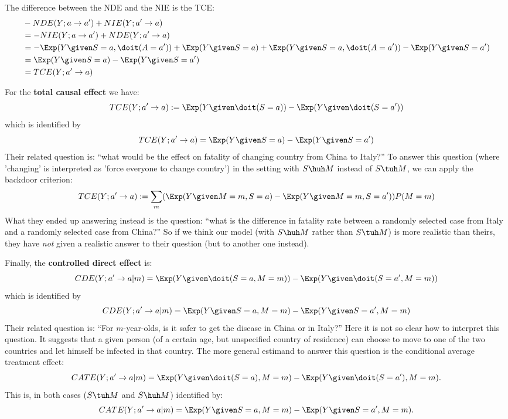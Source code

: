 \begin{Rem}
The difference between the NDE and the NIE is the TCE:
  \begin{equation}\label{eq:nie_interventional+nde_interventional}\begin{split}
    &-NDE(Y; a \to a') + NIE(Y; a' \to a) \\
    & = -NIE(Y; a \to a') + NDE(Y; a' \to a) \\
    & = -\Exp(Y \given S=a, \doit(A=a')) + \Exp(Y \given S=a) + \Exp(Y \given S=a, \doit(A=a')) - \Exp(Y \given S=a') \\
    & =  \Exp(Y \given S=a) - \Exp(Y \given S=a') \\
    & = TCE(Y; a' \to a)
  \end{split}\end{equation}

  For the \textbf{total causal effect} we have:
  $$TCE(Y; a' \to a) := \Exp(Y \given \doit(S=a)) - \Exp(Y \given \doit(S=a'))$$
  which is identified by
  $$TCE(Y; a' \to a) = \Exp(Y \given S=a) - \Exp(Y \given S=a')$$
  Their related question is: ``what would be the effect on fatality of changing country from China to Italy?''
  To answer this question (where 'changing' is interpreted as 'force everyone to change country') in the setting with $S \huh M$ instead of $S \tuh M$, we can apply the backdoor criterion:
  $$TCE(Y; a' \to a) := \sum_m (\Exp(Y \given M=m,S=a) - \Exp(Y \given M=m,S=a')) P(M=m) $$
  What they ended up answering instead is the question: ``what is the difference in fatality rate between a randomly selected case from Italy and a randomly selected case from China?''
  So if we think our model (with $S \huh M$ rather than $S \tuh M$) is more realistic than theirs, they have \emph{not} given a realistic answer to their question (but to another one instead).

  Finally, the \textbf{controlled direct effect} is:
  $$CDE(Y;a'\to a|m) = \Exp(Y \given \doit(S=a,M=m)) - \Exp(Y \given \doit(S=a',M=m))$$
  which is identified by
  $$CDE(Y;a'\to a|m) = \Exp(Y \given S=a,M=m) - \Exp(Y \given S=a',M=m)$$
  Their related question is: ``For $m$-year-olds, is it safer to get the disease in China or in Italy?''
  Here it is not so clear how to interpret this question. 
  It suggests that a given person (of a certain age, but unspecified country of residence) can choose to move to one of the two countries and let himself be infected in that country.
  The more general estimand to answer this question is the conditional average treatment effect:
  $$CATE(Y;a'\to a|m) = \Exp(Y\given \doit(S=a),M=m) - \Exp(Y\given \doit(S=a'),M=m).$$
  This is, in both cases ($S \tuh M$ and $S \huh M$) identified by:
  $$CATE(Y;a'\to a|m) = \Exp(Y \given S=a,M=m) - \Exp(Y \given S=a',M=m).$$
\end{Rem}

